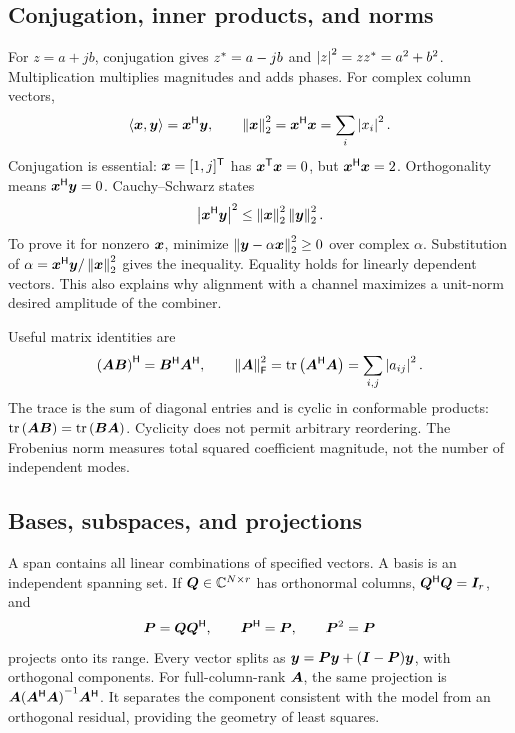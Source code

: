 \subsection{Conjugation, inner products, and norms}
For $z=a+jb$, conjugation gives ${z}^{*}=a-jb$ and $\left|z\right|^2=z{z}^{*}=a^2+b^2$. Multiplication multiplies magnitudes and adds phases. For complex column vectors,
\begin{equation}
\left\langle \bm{x},\bm{y}\right\rangle={\bm{x}}^{\mathsf{H}}\bm{y},\qquad
\left\|\bm{x}\right\|_2^2={\bm{x}}^{\mathsf{H}}\bm{x}=\sum_i\left|x_i\right|^2.
\end{equation}
Conjugation is essential: $\bm{x}=[1,j]^{\mathsf T}$ has ${\bm{x}}^{\mathsf{T}}\bm{x}=0$, but ${\bm{x}}^{\mathsf{H}}\bm{x}=2$. Orthogonality means ${\bm{x}}^{\mathsf{H}}\bm{y}=0$. Cauchy--Schwarz states
\begin{equation}
\left|{\bm{x}}^{\mathsf{H}}\bm{y}\right|^2\leq\left\|\bm{x}\right\|_2^2\left\|\bm{y}\right\|_2^2.
\end{equation}
To prove it for nonzero $\bm{x}$, minimize $\left\|\bm{y}-\alpha\bm{x}\right\|_2^2\geq0$ over complex $\alpha$. Substitution of $\alpha={\bm{x}}^{\mathsf{H}}\bm{y}/\left\|\bm{x}\right\|_2^2$ gives the inequality. Equality holds for linearly dependent vectors. This also explains why alignment with a channel maximizes a unit-norm   desired amplitude of the combiner.

Useful matrix identities are
\begin{equation}
{(\bm{A}\bm{B})}^{\mathsf{H}}={\bm{B}}^{\mathsf{H}}{\bm{A}}^{\mathsf{H}},\qquad
\left\|\bm{A}\right\|_{\mathsf{F}}^2=\operatorname{tr}\left({\bm{A}}^{\mathsf{H}}\bm{A}\right)=\sum_{i,j}\left|a_{ij}\right|^2.
\end{equation}
The trace is the sum of diagonal entries and is cyclic in conformable products: $\operatorname{tr}\left(\bm{A}\bm{B}\right)=\operatorname{tr}\left(\bm{B}\bm{A}\right)$. Cyclicity does not permit arbitrary reordering. The Frobenius norm measures total squared coefficient magnitude, not the number of independent modes.

\subsection{Bases, subspaces, and projections}
A span contains all linear combinations of specified vectors. A basis is an independent spanning set. If $\bm{Q}\in\mathbb{C}^{N\times r}$ has orthonormal columns, ${\bm{Q}}^{\mathsf{H}}\bm{Q}=\bm{I}_r$, and
\begin{equation}
\bm{P}=\bm{Q}{\bm{Q}}^{\mathsf{H}},\qquad {\bm{P}}^{\mathsf{H}}=\bm{P},\qquad \bm{P}^2=\bm{P}
\end{equation}
projects onto its range. Every vector splits as $\bm{y}=\bm{P}\bm{y}+(\bm{I}-\bm{P})\bm{y}$, with orthogonal components. For full-column-rank $\bm{A}$, the same projection is $\bm{A}{({\bm{A}}^{\mathsf{H}}\bm{A})}^{-1}{\bm{A}}^{\mathsf{H}}$. It separates the component consistent with the model from an orthogonal residual, providing the geometry of least squares.

